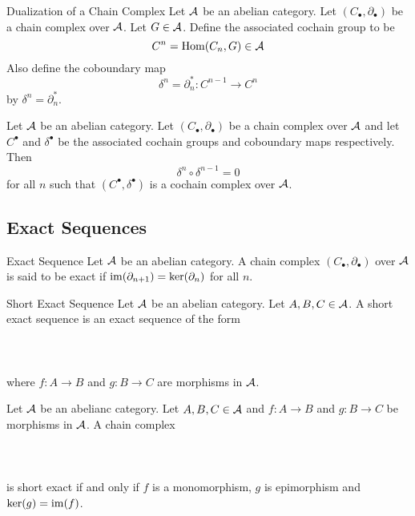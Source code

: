 \documentclass[a4paper]{article}
\begin{document}
\begin{defn}{Dualization of a Chain Complex}{} Let $\mathcal{A}$ be an abelian category. Let $(C_\bullet,\partial_\bullet)$ be a chain complex over $\mathcal{A}$. Let $G\in\mathcal{A}$. Define the associated cochain group to be $$C^n=\operatorname{Hom}(C_n,G)\in\mathcal{A}$$ Also define the coboundary map $$\delta^n=\partial_n^\ast:C^{n-1}\to C^n$$ by $\delta^n=\partial_n^\ast$. 
\end{defn}

\begin{lmm}{}{} Let $\mathcal{A}$ be an abelian category. Let $(C_\bullet,\partial_\bullet)$ be a chain complex over $\mathcal{A}$ and let $C^\bullet$ and $\delta^\bullet$ be the associated cochain groups and coboundary maps respectively. Then $$\delta^n\circ\delta^{n-1}=0$$ for all $n$ such that $(C^\bullet,\delta^\bullet)$ is a cochain complex over $\mathcal{A}$. 
\end{lmm}

\subsection{Exact Sequences}
\begin{defn}{Exact Sequence}{} Let $\mathcal{A}$ be an abelian category. A chain complex $(C_\bullet,\partial_\bullet)$ over $\mathcal{A}$ is said to be exact if $\operatorname{im}(\partial_{n+1})=\ker(\partial_n)$ for all $n$. 
\end{defn}

\begin{defn}{Short Exact Sequence}{} Let $\mathcal{A}$ be an abelian category. Let $A,B,C\in\mathcal{A}$. A short exact sequence is an exact sequence of the form \\~\\
\\~\\
where $f:A\to B$ and $g:B\to C$ are morphisms in $\mathcal{A}$. 
\end{defn}

\begin{prp}{}{} Let $\mathcal{A}$ be an abelianc category. Let $A,B,C\in\mathcal{A}$ and $f:A\to B$ and $g:B\to C$ be morphisms in $\mathcal{A}$. A chain complex \\~\\
\\~\\
is short exact if and only if $f$ is a monomorphism, $g$ is epimorphism and $\ker(g)=\operatorname{im}(f)$. 
\end{prp}
\end{document}
